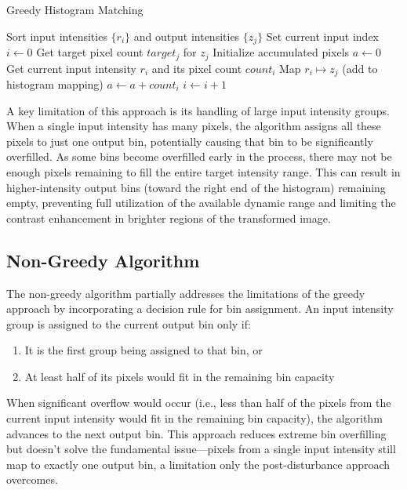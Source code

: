 \documentclass[12pt,a4paper]{article}
\begin{document}
\begin{algorithm}[H]
    \caption{Greedy Histogram Matching}
    \begin{algorithmic}[1]
        \State Sort input intensities $\{r_i\}$ and output intensities $\{z_j\}$
        \State Set current input index $i \gets 0$
            \State Get target pixel count $target_j$ for $z_j$
            \State Initialize accumulated pixels $a \gets 0$
            \State Get current input intensity $r_i$ and its pixel count $count_i$       \State Map $r_i \mapsto z_j$ (add to histogram mapping)
                \State $a \gets a + count_i$
                \State $i \gets i + 1$
            \EndWhile
        \EndFor
    \end{algorithmic}
\end{algorithm}

A key limitation of this approach is its handling of large input intensity groups. When a single input intensity has many pixels, the algorithm assigns all these pixels to just one output bin, potentially causing that bin to be significantly overfilled. As some bins become overfilled early in the process, there may not be enough pixels remaining to fill the entire target intensity range. This can result in higher-intensity output bins (toward the right end of the histogram) remaining empty, preventing full utilization of the available dynamic range and limiting the contrast enhancement in brighter regions of the transformed image. 


\subsection{Non-Greedy Algorithm}

The non-greedy algorithm partially addresses the limitations of the greedy approach by incorporating a decision rule for bin assignment. An input intensity group is assigned to the current output bin only if:

\begin{enumerate}
    \item It is the first group being assigned to that bin, or
    \item At least half of its pixels would fit in the remaining bin capacity
\end{enumerate}

When significant overflow would occur (i.e., less than half of the pixels from the current input intensity would fit in the remaining bin capacity), the algorithm advances to the next output bin. This approach reduces extreme bin overfilling but doesn't solve the fundamental issue—pixels from a single input intensity still map to exactly one output bin, a limitation only the post-disturbance approach overcomes.
\end{document}
